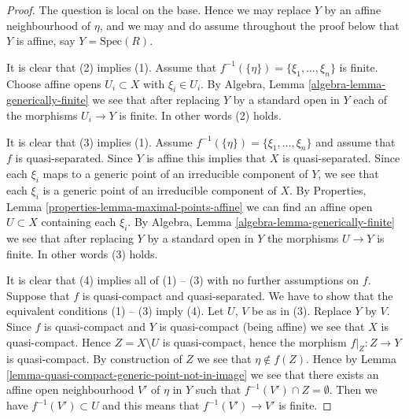 \begin{proof}
The question is local on the base. Hence we may replace $Y$ by an
affine neighbourhood of $\eta$, and we may and do assume throughout
the proof below that $Y$ is affine, say $Y = \text{Spec}(R)$.

\medskip\noindent
It is clear that (2) implies (1).
Assume that $f^{-1}(\{\eta\}) = \{\xi_1, \ldots, \xi_n\}$ is finite.
Choose affine opens $U_i \subset X$ with $\xi_i \in U_i$.
By Algebra, Lemma \ref{algebra-lemma-generically-finite} we see
that after replacing $Y$ by a standard open in
$Y$ each of the morphisms $U_i \to Y$ is finite.
In other words (2) holds.

\medskip\noindent
It is clear that (3) implies (1).
Assume $f^{-1}(\{\eta\}) = \{\xi_1, \ldots, \xi_n\}$ and assume
that $f$ is quasi-separated.
Since $Y$ is affine this implies that $X$ is quasi-separated.
Since each $\xi_i$ maps to a generic point of an irreducible component
of $Y$, we see that each $\xi_i$ is a generic point of an irreducible
component of $X$.
By Properties, Lemma \ref{properties-lemma-maximal-points-affine}
we can find an affine open $U \subset X$ containing each $\xi_i$.
By Algebra, Lemma \ref{algebra-lemma-generically-finite} we see
that after replacing $Y$ by a standard open in
$Y$ the morphisms $U \to Y$ is finite.
In other words (3) holds.

\medskip\noindent
It is clear that (4) implies all of (1) -- (3) with no further assumptions
on $f$. Suppose that $f$ is quasi-compact and quasi-separated. We have to
show that the equivalent conditions (1) -- (3) imply (4).
Let $U$, $V$ be as in (3). Replace $Y$ by $V$. Since $f$ is quasi-compact
and $Y$ is quasi-compact (being affine) we see that $X$ is quasi-compact.
Hence $Z = X \setminus U$ is quasi-compact, hence the morphism
$f|_Z : Z \to Y$ is quasi-compact. By construction of $Z$ we see that
$\eta \not \in f(Z)$. Hence by
Lemma \ref{lemma-quasi-compact-generic-point-not-in-image}
we see that there exists an affine open
neighbourhood $V'$ of $\eta$ in $Y$ such that $f^{-1}(V') \cap Z = \emptyset$.
Then we have $f^{-1}(V') \subset U$ and this means
that $f^{-1}(V') \to V'$ is finite.
\end{proof}

